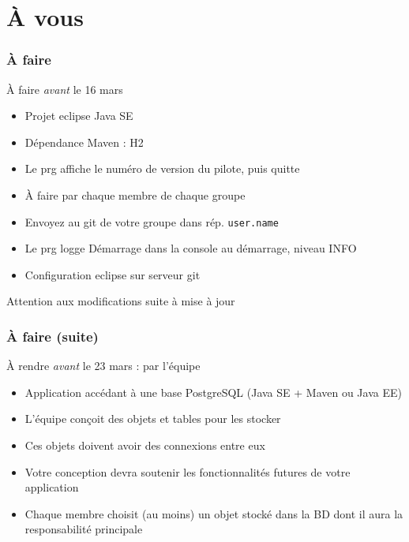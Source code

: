 \documentclass[english, french]{beamer}
\begin{document}
\section{À vous}
\begin{frame}
	\frametitle{À faire}
	\begin{block}{À faire \emph{avant} le 16 mars}
		\begin{itemize}
			\item Projet eclipse \alert{Java SE}
			\item Dépendance Maven : H2
			\item Le prg affiche le numéro de version du pilote, puis quitte
			\item À faire par chaque membre de chaque groupe
			\item Envoyez au git de votre groupe dans rép. \texttt{user.name}
			\item Le prg \alert{logge} \og{}Démarrage\fg{} dans la console au démarrage, niveau INFO
			\item Configuration eclipse sur serveur git
		\end{itemize}
	\end{block}
	\alert{Attention aux modifications suite à mise à jour}
\end{frame}

\begin{frame}
	\frametitle{À faire (suite)}
	\begin{block}{À rendre \emph{avant} le 23 mars : par l’équipe}
		\begin{itemize}
			\item Application accédant à une base PostgreSQL (Java SE + Maven ou Java EE)
		\end{itemize}
	\end{block}
	\begin{itemize}
		\item L’équipe conçoit des objets et tables pour les stocker
		\item Ces objets doivent avoir des connexions entre eux
		\item Votre conception devra soutenir les fonctionnalités futures de votre application
		\item Chaque membre choisit (au moins) un objet stocké dans la BD dont il aura la responsabilité principale
	\end{itemize}
\end{frame}
\end{document}
